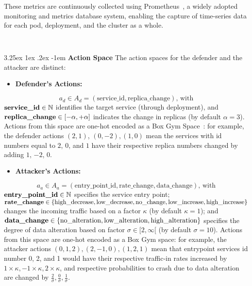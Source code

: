 \documentclass[conference]{IEEEtran}
\makeatletter
\renewcommand\paragraph{\@startsection{paragraph}{5}{\z@}%
  {3.25ex \@plus1ex \@minus.2ex}%
  {-1em}%
  {\normalfont\normalsize\bfseries}}
\makeatother
\begin{document}
These metrics are continuously collected using Prometheus~\cite{prometheus}, a widely adopted monitoring and metrics database system, enabling the capture of time-series data for each pod, deployment, and the cluster as a whole. 

\

\noindent \paragraph{\textbf{Action Space}} The action spaces for the defender and the attacker are distinct:\\
\begin{itemize}
    \item \textbf{Defender's Actions:} 
\end{itemize}
$$
a_d \in A_d = (\text{service\_id}, \text{replica\_change}) \text{, with}
$$
$\text{\textbf{service\_id}} \in \mathbb{N}$ identifies the target service (through deployment), and $\text{\textbf{replica\_change}} \in [-\alpha, +\alpha]$ indicates the change in replicas (by default $\alpha = 3$). Actions from this space are one-hot encoded as a Box Gym Space~\cite{openAIGymActionSpaces}: for example, the defender actions $(2,1)$, $(0,-2), (1,0)$ mean the services with id numbers equal to $2$, $0$, and $1$ have their respective replica numbers changed by adding $1$, $-2$, $0$.\\

\begin{itemize}
    \item \textbf{Attacker's Actions:} 
\end{itemize}
$$
a_a \in A_a = (\text{entry\_point\_id}, \text{rate\_change}, \text{data\_change}) \text{, with}
$$
$\text{\textbf{entry\_point\_id}} \in \mathbb{N}$ specifies the service entry point;
$\text{\textbf{rate\_change}} \in \{\text{high\_decrease}, \text{low\_decrease}, \text{no\_change}, \allowbreak \text{low\_increase}, \allowbreak \text{high\_increase}\}$ changes the incoming traffic based on a factor $\kappa$ (by default $\kappa = 1$); and $\text{\textbf{data\_change}} \in \{\text{no\_alteration}, \allowbreak \text{low\_alteration}, \allowbreak \text{high\_alteration}\}$ specifies the degree of data alteration based on factor $\sigma \in [2,\infty[$ (by default $\sigma = 10$). Actions from this space are one-hot encoded as a Box Gym space: for example, the attacker actions $(0,1,2), (2,-1,0), (1,2,1)$ mean that entrypoint services id number 0, 2, and 1 would have their respective traffic-in rates increased by $1 \times \kappa, -1 \times \kappa, 2 \times \kappa$, and respective probabilities to crash due to data alteration are changed by $\frac{2}{\sigma}, \frac{0}{\sigma}, \frac{1}{\sigma}$.
\end{document}
